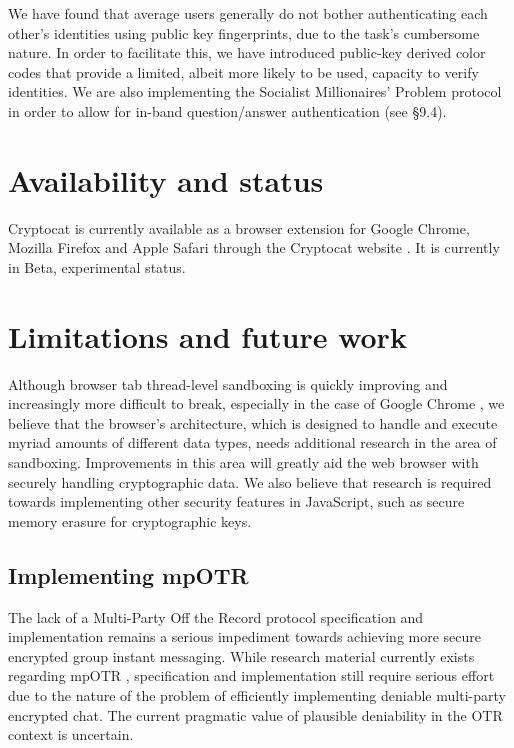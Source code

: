 \documentclass[letterpaper,twocolumn,10pt]{article}
\begin{document}
We have found that average users generally do not bother authenticating each other's identities using public key fingerprints, due to the task's cumbersome nature. In order to facilitate this, we have introduced public-key derived color codes that provide a limited, albeit more likely to be used, capacity to verify identities. We are also implementing the Socialist Millionaires' Problem protocol in order to allow for in-band question/answer authentication (see \S9.4).

\section{Availability and status}

Cryptocat is currently available as a browser extension for Google Chrome, Mozilla Firefox and Apple Safari through the Cryptocat website \cite{cryptocat}. It is currently in Beta, experimental status.

\section{Limitations and future work}

Although browser tab thread-level sandboxing is quickly improving and increasingly more difficult to break, especially in the case of Google Chrome \cite{chrome-sandboxing}, we believe that the browser's architecture, which is designed to handle and execute myriad amounts of different data types, needs additional research in the area of sandboxing. Improvements in this area will greatly aid the web browser with securely handling cryptographic data. We also believe that research is required towards implementing other security features in JavaScript, such as secure memory erasure for cryptographic keys.

\subsection{Implementing mpOTR}

The lack of a Multi-Party Off the Record protocol specification and implementation remains a serious impediment towards achieving more secure encrypted group instant messaging. While research material currently exists regarding mpOTR \cite{mpotr}, specification and implementation still require serious effort due to the nature of the problem of efficiently implementing deniable multi-party encrypted chat. The current pragmatic value of plausible deniability in the OTR context is uncertain.
\end{document}
